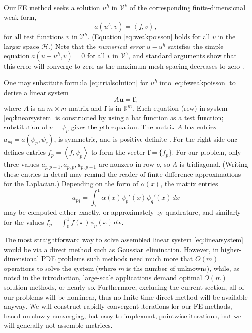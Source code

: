\documentclass[letterpaper,final,12pt,reqno]{amsart}
\theoremstyle{claim}
\newcommand{\RR}{\mathbb{R}}
\newcommand{\bbf}{\mathbf{f}}
\newcommand{\bu}{\mathbf{u}}
\newcommand{\ip}[2]{\left<#1,#2\right>}
\numberwithin{equation}{section}
\numberwithin{figure}{section}
\numberwithin{table}{section}
\numberwithin{theorem}{section}
\begin{document}
Our FE method seeks a solution $u^h$ in $\mathcal{V}^h$ of the corresponding finite-dimensional weak-form,
\begin{equation}
  a(u^h,v) = \ip{f}{v},  \label{eq:feweakpoisson}
\end{equation}
for all test functions $v$ in $\mathcal{V}^h$.  (Equation \eqref{eq:weakpoisson} holds for all $v$ in the larger space $\mathcal{H}$.)  Note that the \emph{numerical error} $u-u^h$ satisfies the simple equation $a(u-u^h,v)=0$ for all $v$ in $\mathcal{V}^h$, and standard arguments show that this error will converge to zero as the maximum mesh spacing decreases to zero \cite{Elmanetal2014}.

One may substitute formula \eqref{eq:trialsolution} for $u^h$ into \eqref{eq:feweakpoisson} to derive a linear system
\begin{equation}
A \bu = \bbf, \label{eq:linearsystem}
\end{equation}
where $A$ is an $m\times m$ matrix and $\bbf$ is in $\RR^m$.  Each equation (row) in system \eqref{eq:linearsystem} is constructed by using a hat function as a test function; substitution of $v=\psi_p$ gives the $p$th equation.  The matrix $A$ has entries $a_{pq} = a(\psi_p,\psi_q)$, is symmetric, and is positive definite \cite{Elmanetal2014}.  For the right side one defines entries $f_p = \ip{f}{\psi_p}$ to form the vector $\bbf = \{f_p\}$.  For our problem, only three values $a_{p,p-1}, a_{p,p}, a_{p,p+1}$ are nonzero in row $p$, so $A$ is tridiagonal.  (Writing these entries in detail may remind the reader of finite difference approximations for the Laplacian.)  Depending on the form of $\alpha(x)$, the matrix entries
\begin{equation}
  a_{pq} = \int_0^1 \alpha(x) \psi_p'(x) \psi_q'(x)\,dx \label{eq:poissonentries}
\end{equation}
may be computed either exactly, or approximately by quadrature, and similarly for the values $f_p = \int_0^1 f(x) \psi_p(x)\,dx$.

The most straightforward way to solve assembled linear system \eqref{eq:linearsystem} would be via a direct method such as Gaussian elimination.  However, in higher-dimensional PDE problems such methods need much more that $O(m)$ operations to solve the system (where $m$ is the number of unknowns), while, as noted in the introduction, large-scale applications demand optimal $O(m)$ solution methods, or nearly so.  Furthermore, excluding the current section, all of our problems will be nonlinear, thus no finite-time direct method will be available anyway.  We will construct rapidly-convergent iterations for our FE methods, based on slowly-converging, but easy to implement, pointwise iterations, but we will generally not assemble matrices.
\end{document}
